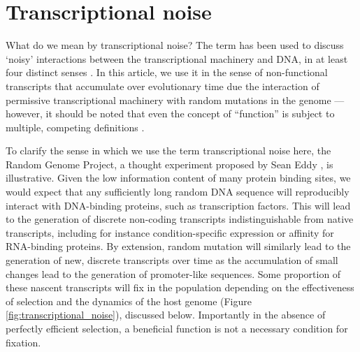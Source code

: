\section{Transcriptional noise}

What do we mean by transcriptional noise? The term has been used to discuss ‘noisy’ interactions between the transcriptional machinery and DNA, in at least four distinct senses \citep{Raser2005-hm}. In this article, we use it in the sense of non-functional transcripts that accumulate over evolutionary time due the interaction of permissive transcriptional machinery with random mutations in the genome \citep{Struhl2007-ry} — however, it should be noted that even the concept of “function” is subject to multiple, competing definitions \citep{Doolittle2018-ha}.\par 

To clarify the sense in which we use the term transcriptional noise here, the Random Genome Project, a thought experiment proposed by Sean Eddy \citep{Eddy2013-fa}, is illustrative. Given the low information content of many protein binding sites, we would expect that any sufficiently long random DNA sequence will reproducibly interact with DNA-binding proteins, such as transcription factors. This will lead to the generation of discrete non-coding transcripts indistinguishable from native transcripts, including for instance condition-specific expression or affinity for RNA-binding proteins. By extension, random mutation will similarly lead to the generation of new, discrete transcripts over time as the accumulation of small changes lead to the generation of promoter-like sequences. Some proportion of these nascent transcripts will fix in the population depending on the effectiveness of selection and the dynamics of the host genome (Figure \ref{fig:transcriptional_noise}), discussed below. Importantly in the absence of perfectly efficient selection, a beneficial function is not a necessary condition for fixation.

